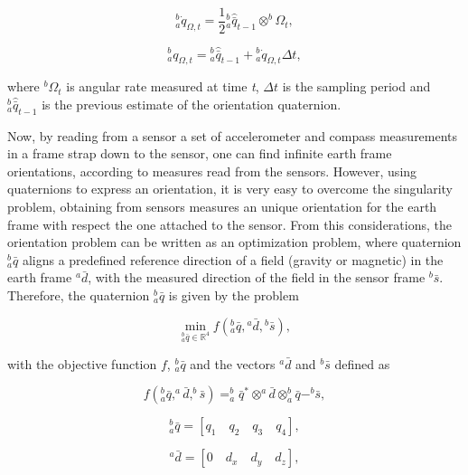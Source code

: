 \begin{equation}
\label{eq4_03}
^b_a \dot{q}_{\Omega,t} = \frac{1}{2} {^b_a \hat{\bar{q}}_{t-1}} \otimes ^b \Omega_t,
\end{equation}

\begin{equation}
\label{eq4_04}
^b_a q_{\Omega,t} = {^b_a \hat{\bar{q}}_{t-1}} + {^b_a \dot{q}_{\Omega,t}} \Delta t,
\end{equation}

\noindent where $^b \Omega_t$ is angular rate measured at time \textit{t}, $\Delta t$ is the sampling period and $^b_a \hat{\bar{q}}_{t-1}$ is the previous estimate of the orientation quaternion.

Now, by reading from a sensor a set of accelerometer and compass measurements in a frame strap down to the sensor, one can find infinite earth frame orientations, according to measures read from the sensors.
However, using quaternions to express an orientation, it is very easy to overcome the singularity problem, obtaining from sensors measures an unique orientation for the earth frame with respect the one attached to the sensor.
From this considerations, the orientation problem can be written as an optimization problem, where quaternion $^b_a \bar{q}$ aligns a predefined reference direction of a field (gravity or magnetic) in the earth frame $^a \bar{d}$, with the measured direction of the field in the sensor frame $^b \bar{s}$. Therefore, the quaternion $^b_a \bar{q}$ is given by the problem

\begin{equation}
\label{eq4_05}
\min_{{^b_a \bar{q}} \in \mathbb{R}^4} f({^b_a \bar{q}}, {^a \bar{d}}, {^b \bar{s}}),
\end{equation}

\noindent with the objective function $f$, $^b_a \bar{q}$ and the vectors $^a \bar{d}$ and $^b \bar{s}$ defined as

\begin{equation}
\label{eq4_06}
f(^b_a \bar{q},^a \bar{d}, ^b \bar{s}) = ^b_a \bar{q}^{*} \otimes ^a \bar{d} \otimes ^b_a \bar{q} - ^b \bar{s},
\end{equation}

\begin{equation}
\label{eq4_07}
^b_a \bar{q} = [q_1 \quad q_2 \quad q_3 \quad q_4],
\end{equation}

\begin{equation}
\label{eq4_08}
^a \bar{d} = [0 \quad d_x \quad d_y \quad d_z],
\end{equation}

